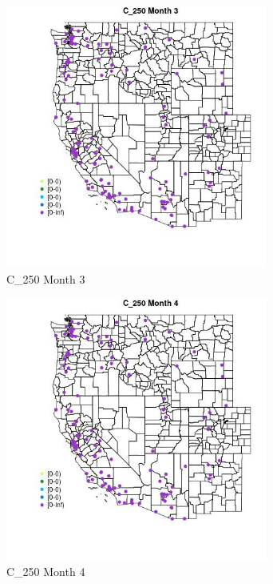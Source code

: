 \begin{figure} 
\centering  
\includegraphics[width=0.77\textwidth]{Code_Outputs/Report_ML_input_PM25_Step4_part_e_de_duplicated_aves_MapObsMo3C_250.jpg} 
\caption{\label{fig:Report_ML_input_PM25_Step4_part_e_de_duplicated_avesMapObsMo3C_250}C_250 Month 3} 
\end{figure} 
 

\begin{figure} 
\centering  
\includegraphics[width=0.77\textwidth]{Code_Outputs/Report_ML_input_PM25_Step4_part_e_de_duplicated_aves_MapObsMo4C_250.jpg} 
\caption{\label{fig:Report_ML_input_PM25_Step4_part_e_de_duplicated_avesMapObsMo4C_250}C_250 Month 4} 
\end{figure} 
 

